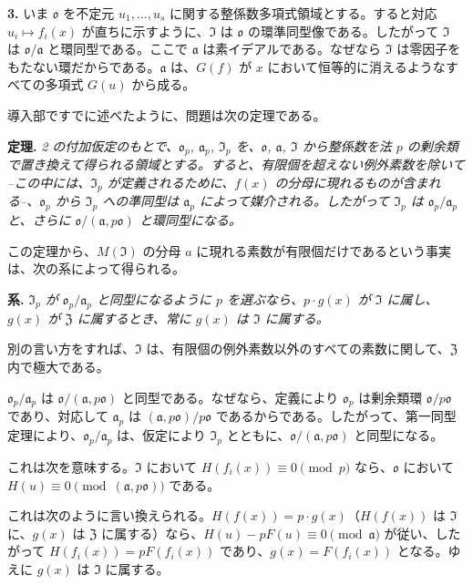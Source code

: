 \medskip\noindent\textbf{3.}
いま $\mathfrak{o}$ を不定元 $u_1,\ldots,u_s$ に関する整係数多項式領域とする。すると対応 $u_i\mapsto f_i(x)$ が直ちに示すように、$\mathfrak{I}$ は $\mathfrak{o}$ の環準同型像である。したがって $\mathfrak{I}$ は $\mathfrak{o}/\mathfrak{a}$ と環同型である。ここで $\mathfrak{a}$ は素イデアルである。なぜなら $\mathfrak{I}$ は零因子をもたない環だからである。$\mathfrak{a}$ は、$G(f)$ が $x$ において恒等的に消えるようなすべての多項式 $G(u)$ から成る。

導入部ですでに述べたように、問題は次の定理である。

\medskip\noindent\textbf{定理.}
\emph{2 の付加仮定のもとで、$\mathfrak{o}_p$, $\mathfrak{a}_p$, $\mathfrak{I}_p$ を、$\mathfrak{o}$, $\mathfrak{a}$, $\mathfrak{I}$ から整係数を法 $p$ の剰余類で置き換えて得られる領域とする。すると、有限個を超えない例外素数を除いて --この中には、$\mathfrak{I}_p$ が定義されるために、$f(x)$ の分母に現れるものが含まれる--、$\mathfrak{o}_p$ から $\mathfrak{I}_p$ への準同型は $\mathfrak{a}_p$ によって媒介される。したがって $\mathfrak{I}_p$ は $\mathfrak{o}_p/\mathfrak{a}_p$ と、さらに $\mathfrak{o}/(\mathfrak{a},p\mathfrak{o})$ と環同型になる。}

この定理から、$M(\mathfrak{I})$ の分母 $a$ に現れる素数が有限個だけであるという事実は、次の系によって得られる。

\medskip\noindent\textbf{系.}
\emph{$\mathfrak{I}_p$ が $\mathfrak{o}_p/\mathfrak{a}_p$ と同型になるように $p$ を選ぶなら、$p\cdot g(x)$ が $\mathfrak{I}$ に属し、$g(x)$ が $\mathfrak{Z}$ に属するとき、常に $g(x)$ は $\mathfrak{I}$ に属する。}

別の言い方をすれば、$\mathfrak{I}$ は、有限個の例外素数以外のすべての素数に関して、$\mathfrak{Z}$ 内で極大である。

$\mathfrak{o}_p/\mathfrak{a}_p$ は $\mathfrak{o}/(\mathfrak{a},p\mathfrak{o})$ と同型である。なぜなら、定義により $\mathfrak{o}_p$ は剰余類環 $\mathfrak{o}/p\mathfrak{o}$ であり、対応して $\mathfrak{a}_p$ は $(\mathfrak{a},p\mathfrak{o})/p\mathfrak{o}$ であるからである。したがって、第一同型定理により、$\mathfrak{o}_p/\mathfrak{a}_p$ は、仮定により $\mathfrak{I}_p$ とともに、$\mathfrak{o}/(\mathfrak{a},p\mathfrak{o})$ と同型になる。

これは次を意味する。$\mathfrak{I}$ において $H(f_i(x))\equiv0\pmod p$ なら、$\mathfrak{o}$ において $H(u)\equiv0\pmod{(\mathfrak{a},p\mathfrak{o})}$ である。

これは次のように言い換えられる。$H(f(x))=p\cdot g(x)$（$H(f(x))$ は $\mathfrak{I}$ に、$g(x)$ は $\mathfrak{Z}$ に属する）なら、$H(u)-pF(u)\equiv0\pmod{\mathfrak{a}}$ が従い、したがって $H(f_i(x))=pF(f_i(x))$ であり、$g(x)=F(f_i(x))$ となる。ゆえに $g(x)$ は $\mathfrak{I}$ に属する。

